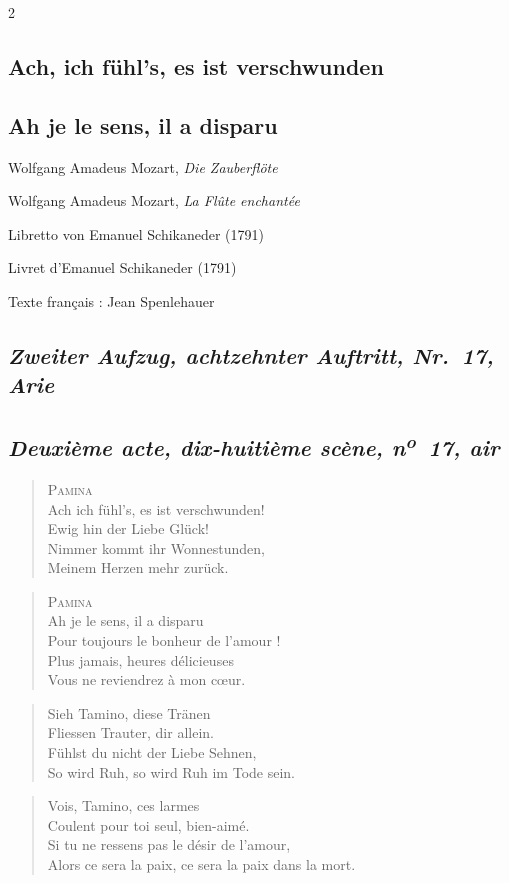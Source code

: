\documentclass[a4paper,12pt]{article}
\newcommand\chunks[2]{%
\begin{leftcolumn*}\begin{otherlanguage}{german}%
{#1}%
\end{otherlanguage}\end{leftcolumn*}%
\begin{rightcolumn}\begin{otherlanguage}{french}%
{#2}%
\end{otherlanguage}\end{rightcolumn}%
}
\newcommand\strophe[1]{\subsection*{\normalsize\normalfont\itshape #1}}
\begin{document}
\thispagestyle{empty}
\setlength{\columnsep}{8mm}


\begin{paracol}{2}

  \chunks{\section*{Ach, ich fühl’s, es ist verschwunden}}
         {\section*{Ah je le sens, il a disparu}}

  \chunks{\noindent\raggedright\small Wolfgang Amadeus Mozart, \textit{Die Zauberflöte}}
         {\noindent\raggedright\small Wolfgang Amadeus Mozart, \textit{La Flûte enchantée}}

  \chunks{\noindent\raggedright\small Libretto von Emanuel Schikaneder (1791)}
         {\noindent\raggedright\small Livret d’Emanuel Schikaneder (1791)}

  \chunks{}
         {\noindent\raggedright\small Texte français : Jean Spenlehauer}

  \chunks{\strophe{Zweiter Aufzug, achtzehnter Auftritt, Nr.~17, Arie}}
         {\strophe{Deuxième acte, dix-huitième scène, n\textsuperscript{o}~17, air}}

  \chunks{\begin{verse}
          \textsc{Pamina}\\[\medskipamount]
          Ach ich fühl’s, es ist verschwunden!\\
          Ewig hin der Liebe Glück!\\
          Nimmer kommt ihr Wonnestunden,\\
          Meinem Herzen mehr zurück.
          \end{verse}}
         {\begin{verse}
          \textsc{Pamina}\\[\medskipamount]
          Ah je le sens, il a disparu\\
          Pour toujours le bonheur de l’amour !\\
          Plus jamais, heures délicieuses\\
          Vous ne reviendrez à mon cœur.
          \end{verse}}

  \chunks{\begin{verse}
          Sieh Tamino, diese Tränen\\
          Fliessen Trauter, dir allein.\\
          Fühlst du nicht der Liebe Sehnen,\\
          So wird Ruh, so wird Ruh im Tode sein.
          \end{verse}}
         {\begin{verse}
          Vois, Tamino, ces larmes\\
          Coulent pour toi seul, bien-aimé.\\
          Si tu ne ressens pas le désir de l’amour,\\
          Alors ce sera la paix, ce sera la paix dans la mort.
          \end{verse}}
\end{paracol}
\end{document}
